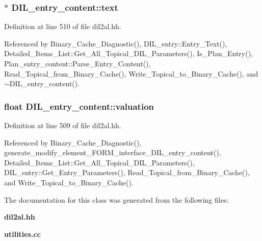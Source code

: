 \subsubsection{$\ast$ DIL\_\-entry\_\-content::text}\label{classDIL__entry__content_m4}




Definition at line 510 of file dil2al.hh.

Referenced by Binary\_\-Cache\_\-Diagnostic(), DIL\_\-entry::Entry\_\-Text(), Detailed\_\-Items\_\-List::Get\_\-All\_\-Topical\_\-DIL\_\-Parameters(), Is\_\-Plan\_\-Entry(), Plan\_\-entry\_\-content::Parse\_\-Entry\_\-Content(), Read\_\-Topical\_\-from\_\-Binary\_\-Cache(), Write\_\-Topical\_\-to\_\-Binary\_\-Cache(), and $\sim$DIL\_\-entry\_\-content().
\subsubsection{\setlength{\rightskip}{0pt plus 5cm}float DIL\_\-entry\_\-content::valuation}\label{classDIL__entry__content_m3}




Definition at line 509 of file dil2al.hh.

Referenced by Binary\_\-Cache\_\-Diagnostic(), generate\_\-modify\_\-element\_\-FORM\_\-interface\_\-DIL\_\-entry\_\-content(), Detailed\_\-Items\_\-List::Get\_\-All\_\-Topical\_\-DIL\_\-Parameters(), DIL\_\-entry::Get\_\-Entry\_\-Parameters(), Read\_\-Topical\_\-from\_\-Binary\_\-Cache(), and Write\_\-Topical\_\-to\_\-Binary\_\-Cache().

The documentation for this class was generated from the following files:\begin{CompactItemize}
\item 
{\bf dil2al.hh}\item 
{\bf utilities.cc}\end{CompactItemize}
